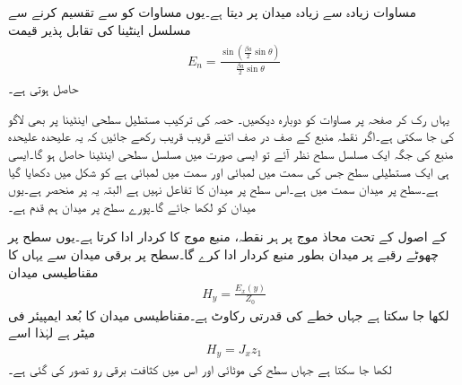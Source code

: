 مساوات  زیادہ سے زیادہ میدان  پر  دیتا ہے۔یوں مساوات  کو  سے تقسیم کرنے سے مسلسل اینٹینا کی تقابل پذیر قیمت 
\begin{gather}
\begin{aligned}\label{مساوات_اینٹینا_مسلسل_ب}
E_n=\frac{\sin \left(\frac{\beta a }{2} \sin \theta \right)}{\frac{\beta a }{2}\sin \theta}
\end{aligned}
\end{gather}
حاصل ہوتی ہے۔

یہاں رک کر صفحہ  پر مساوات  کو دوبارہ دیکھیں۔
حصہ  کی ترکیب مستطیل سطحی اینٹینا پر بھی لاگو کی جا سکتی ہے۔اگر نقطہ منبع کے صف در صف اتنے قریب قریب رکھے جائیں کہ یہ علیحدہ علیحدہ منبع کی جگہ ایک مسلسل سطح نظر آئے تو ایسی صورت میں مسلسل سطحی اینٹینا حاصل ہو گا۔ایسی ہی ایک مستطیلی سطح جس کی  سمت میں لمبائی  اور  سمت میں لمبائی  ہے کو شکل میں دکھایا گیا ہے۔سطح پر میدان  سمت میں ہے۔اس سطح پر میدان  کا تفاعل نہیں ہے البتہ یہ  پر منحصر ہے۔یوں میدان کو  لکھا جائے گا۔پورے سطح پر میدان ہم قدم ہے۔

 کے اصول کے تحت محاذ موج پر ہر نقطہ، منبع موج کا کردار ادا کرتا ہے۔یوں سطح پر چھوٹے رقبے   پر میدان  بطور منبع کردار ادا کرے گا۔سطح پر برقی میدان  سے یہاں کا مقناطیسی میدان
\begin{align}
H_y=\frac{E_x(y)}{Z_0}
\end{align}
لکھا جا سکتا ہے جہاں  خطے کی قدرتی رکاوٹ  ہے۔مقناطیسی میدان کا بُعد ایمپیئر فی میٹر  ہے لہٰذا اسے
\begin{align}
H_y=J_x z_1
\end{align}
لکھا جا سکتا ہے جہاں سطح کی موٹائی  اور اس میں کثافت برقی  رو  تصور کی گئی ہے۔

